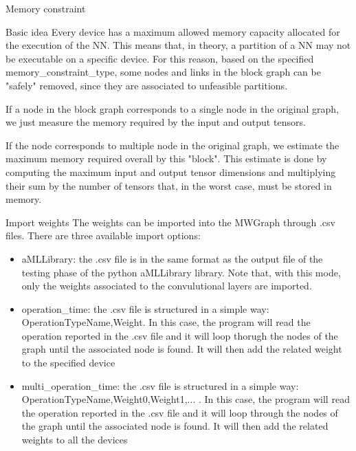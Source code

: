 \begin{frame}{Memory constraint}
    \begin{block}{Basic idea}
    Every device has a maximum allowed memory capacity allocated for the execution of the NN. This means that, in theory, a partition of a NN may not be executable on a specific device. For this reason, based on the specified memory\_constraint\_type, some nodes and links in the block graph can be "safely" removed, since they are associated to unfeasible partitions.
    \end{block}
    
    If a node in the block graph corresponds to a single node in the original graph, we just measure the memory required by the input and output tensors. 
    
    If the node corresponds to multiple node in the original graph, we estimate the maximum memory required overall by this "block". This estimate is done by computing the maximum input and output tensor dimensions and multiplying their sum by the number of tensors that, in the worst case, must be stored in memory.
\end{frame}

\begin{frame}{Import weights}
    The weights can be imported into the MWGraph through .csv files. There are three available import options:
    \begin{itemize}
        \item aMLLibrary: the .csv file is in the same format as the output file of the testing phase of the python aMLLibrary library. Note that, with this mode, only the weights associated to the convulutional layers are imported. 
        \item operation\_time: the .csv file is structured in a simple way: OperationTypeName,Weight. In this case, the program will read the operation reported in the .csv file and it will loop thorugh the nodes of the graph until the associated node is found. It will then add the related weight to the specified device
        \item multi\_operation\_time: the .csv file is structured in a simple way: OperationTypeName,Weight0,Weight1,... . In this case, the program will read the operation reported in the .csv file and it will loop through the nodes of the graph until the associated node is found. It will then add the related weights to all the devices
    \end{itemize}
\end{frame}

